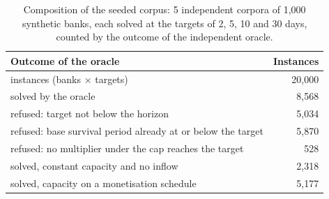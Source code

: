 \begin{table}[htbp]
\centering
\small
\setlength{\tabcolsep}{3pt}
\caption{Composition of the seeded corpus: 5 independent corpora of 1,000 synthetic banks, each solved at the targets of 2, 5, 10 and 30 days, counted by the outcome of the independent oracle.}
\label{tab:design}
\begin{tabular}{lr}
\toprule
Outcome of the oracle & Instances \\
\midrule
instances (banks $\times$ targets) & 20,000 \\
solved by the oracle & 8,568 \\
refused: target not below the horizon & 5,034 \\
refused: base survival period already at or below the target & 5,870 \\
refused: no multiplier under the cap reaches the target & 528 \\
solved, constant capacity and no inflow & 2,318 \\
solved, capacity on a monetisation schedule & 5,177 \\
\bottomrule
\end{tabular}
\end{table}
